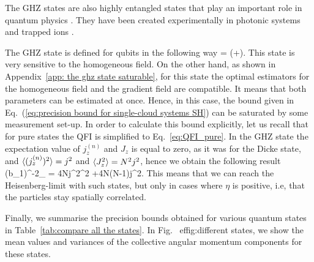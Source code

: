
The GHZ states are also highly entangled states that play an important role in quantum physics \citep{Greenberger1990}.
They have been created experimentally in photonic systems \citep{Pan2000,Yao2012,Lu2007} and trapped ions \citep{Sackett2000,Monz2011}.

The GHZ state is defined for qubits in the following way
\be
\label{eq:definition of ghz}
 = (+).
\ee
This state is very sensitive to the homogeneous field.
On the other hand, as shown in Appendix~\ref{app: the ghz state saturable}, for this state the optimal estimators for the homogeneous field and the gradient field are compatible.
It means that both parameters can be estimated at once.
Hence, in this case, the bound given in Eq.~(\ref{eq:precision bound for single-cloud systems SH}) can be saturated by some measurement set-up.
In order to calculate this bound explicitly, let us recall that for pure states the QFI is simplified to Eq.~\eqref{eq:QFI_pure}.
In the GHZ state the expectation value of $j_z^{(n)}$ and
$J_z$ is equal to zero, as it was for the Dicke state, and $\langle (j_z^{(n)})^2 \rangle=j^2$ and $\langle J_z^2 \rangle
= N^2j^2$, hence we obtain the following result
\be
\label{eq:precision bound for ghz}
(\Delta b_1)^{-2}_{\max} = 4Nj^2\sigma^2 +4N(N-1)j^2\eta.
\ee
This means that we can reach the Heisenberg-limit with such states, but only in
cases where $\eta$ is positive, i.e, that the particles stay spatially correlated.


Finally, we summarise the precision bounds obtained for various quantum states in Table~\ref{tab:compare all the states}.
In Fig.~
ef{fig:different states}, we show the mean values and variances
of the collective angular momentum components for these states.

